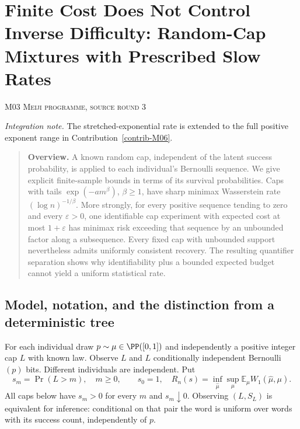 \documentclass[11pt,a4paper]{article}
\theoremstyle{definition}\newtheorem{definition}[theorem]{Definition}
\theoremstyle{remark}\newtheorem{remark}[theorem]{Remark}
\newcommand{\E}{\mathbb E}\newcommand{\one}{\mathbf 1}\newcommand{\1}{\mathbf 1}
\numberwithin{equation}{section}
\begin{document}
\clearpage
\section[M03 --- Finite Cost Does Not Control Inverse Difficulty: Random-Cap Mixtures with Prescribed Slow Rates]{Finite Cost Does Not Control Inverse Difficulty: Random-Cap Mixtures with Prescribed Slow Rates}\label{contrib-M03}
\noindent\textsc{M03 \quad Meiji programme, source round 3}\par\medskip
\noindent\textit{Integration note.} The stretched-exponential rate is extended to the full positive exponent range in Contribution~\ref{contrib-M06}.\par\medskip


\begin{quote}\small\textbf{Overview.} A known random cap, independent of the latent success probability, is applied to each individual's Bernoulli sequence. We give explicit finite-sample bounds in terms of its survival probabilities. Caps with tails $\exp(-a m^\beta)$, $\beta\ge1$, have sharp minimax Wasserstein rate $(\log n)^{-1/\beta}$. More strongly, for every positive sequence tending to zero and every $\varepsilon>0$, one identifiable cap experiment with expected cost at most $1+\varepsilon$ has minimax risk exceeding that sequence by an unbounded factor along a subsequence. Every fixed cap with unbounded support nevertheless admits uniformly consistent recovery. The resulting quantifier separation shows why identifiability plus a bounded expected budget cannot yield a uniform statistical rate.\end{quote}

\subsection{Model, notation, and the distinction from a deterministic tree}\label{M03-sec-1}
For each individual draw $p\sim\mu\in\PP([0,1])$ and independently a positive integer cap $L$ with known law. Observe $L$ and $L$ conditionally independent Bernoulli$(p)$ bits. Different individuals are independent. Put
\[
 s_m=\Pr(L>m),\quad m\ge0,\qquad s_0=1,
 \quad R_n(s)=\inf_{\widehat\mu}\sup_\mu\E_\mu W_1(\widehat\mu,\mu).
\]
All caps below have $s_m>0$ for every $m$ and $s_m\downarrow0$. Observing $(L,S_L)$ is equivalent for inference: conditional on that pair the word is uniform over words with its success count, independently of $p$.
\end{document}
